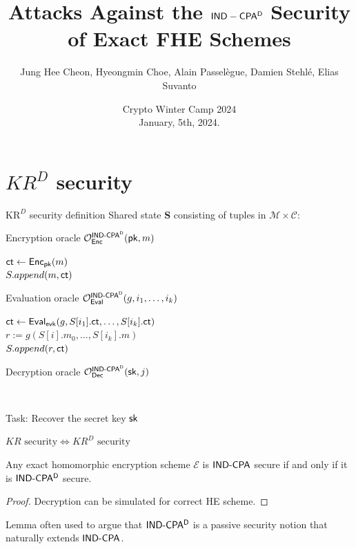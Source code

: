 \documentclass{beamer}
\title{Attacks Against the $\sf{IND-CPA^D}$ Security of Exact FHE Schemes}
\author{Jung Hee Cheon, Hyeongmin Choe, Alain Passelègue, Damien Stehlé, Elias Suvanto}
\date{
\vspace{0.5cm}
\centering
Crypto Winter Camp 2024\\
January, 5th, 2024.
}
\begin{document}
	\begin{frame}[plain]
	    \maketitle
	\end{frame}
	
	\section{$KR^D$ security}

	\begin{frame}{$\text{KR}^D$ security definition}
		Shared state \textbf{S} consisting of tuples in $\mathcal{M} \times \mathcal{C}$:
		\begin{algorithm}[H]
			\scriptsize
			\caption{Encryption oracle ${\mathcal O}_{\sf Enc}^\text{\sf IND-CPA$\sf ^D$}({\sf pk}, m)$}
			$\mathsf{ct} \gets {\sf Enc}_{{\sf pk}}(m)$\\
			$S.append(m, \mathsf{ct})$\\
			\Return{$\ct$}
		\end{algorithm}
		\begin{algorithm}[H]
			\scriptsize
			\caption{Evaluation oracle ${\mathcal O}_{\mathsf{Eval}}^\text{\sf IND-CPA$\sf ^D$}(g, i_1, \dots, i_k)$}
			$\ct \gets \Eval_{\evk}(g, S[i_1].\ct, \dots, S[i_k].\ct)$\\
			$r := g(S[i].m_0, \dots, S[i_k].m)$\\
			$S.append(r, \mathsf{ct})$\\
			\Return{$\ct$}
		\end{algorithm}
		
		\begin{algorithm}[H]
			\caption{Decryption oracle ${\mathcal O}_{\sf Dec}^\text{\sf IND-CPA$\sf ^D$}({\sf sk}, j)$}
			\\
		\end{algorithm}
	Task: Recover the secret key ${\sf sk}$
	\end{frame}

	\begin{frame}{$KR \text{ security} \Leftrightarrow KR^D \text{ security}$}
		\begin{center}
		\begin{theorem}[LIMI21]
			Any exact homomorphic encryption scheme $\mathcal{E}$ is $\text{\sf IND-CPA}$ secure if and only if it is $\text{\sf IND-CPA$\sf ^D$}$ secure.
		\end{theorem}
		\begin{proof}
			Decryption can be simulated for correct HE scheme.
		\end{proof}
	\end{center}
	
		Lemma often used to argue that $\text{\sf IND-CPA$\sf ^D$}$ is a passive security notion that naturally extends $\text{\sf IND-CPA}$.
	\end{frame}
\end{document}
